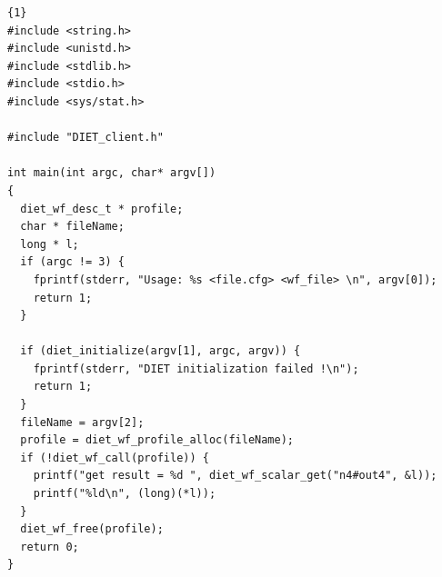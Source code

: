 \begin{lstlisting}{1}
#include <string.h>
#include <unistd.h>
#include <stdlib.h>
#include <stdio.h>
#include <sys/stat.h>

#include "DIET_client.h"

int main(int argc, char* argv[])
{
  diet_wf_desc_t * profile;
  char * fileName;
  long * l;
  if (argc != 3) {
    fprintf(stderr, "Usage: %s <file.cfg> <wf_file> \n", argv[0]);
    return 1;
  }

  if (diet_initialize(argv[1], argc, argv)) {
    fprintf(stderr, "DIET initialization failed !\n");
    return 1;
  }
  fileName = argv[2];
  profile = diet_wf_profile_alloc(fileName);
  if (!diet_wf_call(profile)) {
    printf("get result = %d ", diet_wf_scalar_get("n4#out4", &l));
    printf("%ld\n", (long)(*l));
  }
  diet_wf_free(profile);
  return 0;
}
\end{lstlisting}

%
%
%
%


